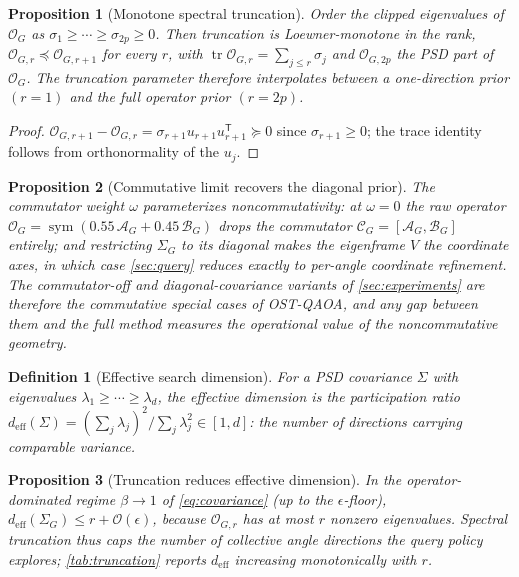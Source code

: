 \documentclass[aps,prresearch,reprint,amsmath,amssymb,floatfix,nofootinbib,superscriptaddress,longbibliography]{revtex4-2}
\newtheorem{definition}{Definition}
\newtheorem{proposition}{Proposition}
\theoremstyle{remark}
\newcommand{\OSTQAOA}{\textnormal{\textsc{OST-QAOA}}}
\newcommand{\calO}{\mathcal{O}}
\newcommand{\calA}{\mathcal{A}}
\newcommand{\calB}{\mathcal{B}}
\newcommand{\calC}{\mathcal{C}}
\begin{document}
\begin{proposition}[Monotone spectral truncation]
\label{prop:mono}
Order the clipped eigenvalues of \(\calO_G\) as
\(\sigma_1\ge\cdots\ge\sigma_{2p}\ge0\).  Then truncation is Loewner-monotone in
the rank, \(\calO_{G,r}\preceq\calO_{G,r+1}\) for every \(r\), with
\(\operatorname{tr}\calO_{G,r}=\sum_{j\le r}\sigma_j\) and \(\calO_{G,2p}\) the
PSD part of \(\calO_G\).  The truncation parameter therefore interpolates between
a one-direction prior \((r{=}1)\) and the full operator prior \((r{=}2p)\).
\end{proposition}
\begin{proof}
\(\calO_{G,r+1}-\calO_{G,r}=\sigma_{r+1}u_{r+1}u_{r+1}^{\mathsf T}\succeq0\) since
\(\sigma_{r+1}\ge0\); the trace identity follows from orthonormality of the
\(u_j\).
\end{proof}

\begin{proposition}[Commutative limit recovers the diagonal prior]
\label{prop:limit}
The commutator weight \(\omega\) parameterizes noncommutativity: at \(\omega=0\)
the raw operator \(\calO_G=\operatorname{sym}(0.55\,\calA_G+0.45\,\calB_G)\) drops
the commutator \(\calC_G=[\calA_G,\calB_G]\) entirely; and restricting
\(\Sigma_G\) to its diagonal makes the eigenframe \(V\) the coordinate axes, in
which case \cref{sec:query} reduces exactly to per-angle coordinate refinement.
The commutator-off and diagonal-covariance variants of \cref{sec:experiments}
are therefore the commutative special cases of \OSTQAOA{}, and any gap between
them and the full method measures the operational value of the noncommutative
geometry.
\end{proposition}

\begin{definition}[Effective search dimension]
\label{def:deff}
For a PSD covariance \(\Sigma\) with eigenvalues
\(\lambda_1\ge\cdots\ge\lambda_d\), the effective dimension is the participation
ratio
\(d_{\mathrm{eff}}(\Sigma)=(\sum_j\lambda_j)^2/\sum_j\lambda_j^2\in[1,d]\): the
number of directions carrying comparable variance.
\end{definition}

\begin{proposition}[Truncation reduces effective dimension]
\label{prop:deff}
In the operator-dominated regime \(\beta\to1\) of \cref{eq:covariance} (up to the
\(\epsilon\)-floor), \(d_{\mathrm{eff}}(\Sigma_G)\le r+\mathcal O(\epsilon)\),
because \(\calO_{G,r}\) has at most \(r\) nonzero eigenvalues.  Spectral
truncation thus caps the number of collective angle directions the query policy
explores; \cref{tab:truncation} reports \(d_{\mathrm{eff}}\) increasing
monotonically with \(r\).
\end{proposition}
\end{document}
